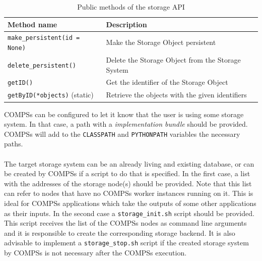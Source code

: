\begin{table}[]
\centering
\begin{tabular}{|l|l|}
\hline
Method name                                                     & Description                                                        \\ \hline
\verb|make_persistent(id = None)| & Make the Storage Object persistent                                 \\ \hline
\verb|delete_persistent()|        & Delete the Storage Object from the Storage System                  \\ \hline
\verb|getID()|                     & Get the identifier of the Storage Object                           \\ \hline
\verb|getByID(*objects)| (static)  & Retrieve the objects with the given identifiers \\ \hline
\end{tabular}
\caption{Public methods of the storage API}
\label{table:storage_api_public_methods}
\end{table}

COMPSs can be configured to let it know that the user is using some storage system. In that case, a path with a \textit{implementation bundle} should be provided. COMPSs will add to the \verb|CLASSPATH| and \verb|PYTHONPATH| variables the necessary paths.\\
\\
The target storage system can be an already living and existing database, or can be created by COMPSs if a script to do that is specified. In the first case, a list with the addresses of the storage node(s) should be provided. Note that this list can refer to nodes that have no COMPSs worker instances running on it. This is ideal for COMPSs applications which take the outputs of some other applications as their inputs. In the second case a \verb|storage_init.sh| script should be provided. This script receives the list of the COMPSs nodes as command line arguments and it is responsible to create the corresponding storage backend. It is also advisable to implement a \verb|storage_stop.sh| script if the created storage system by COMPSs is not necessary after the COMPSs execution.

